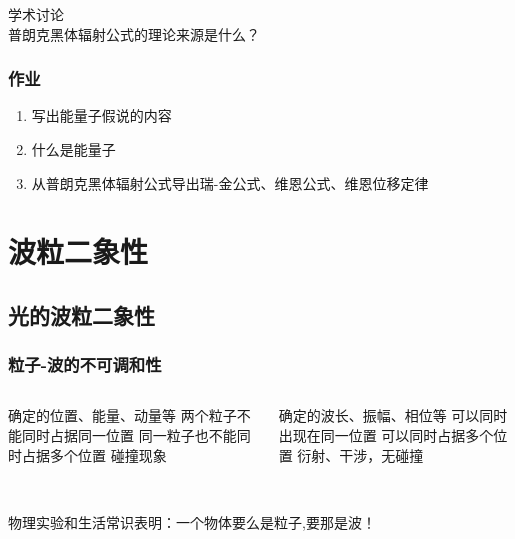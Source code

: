 \begin{frame}
    \frametitle{}
    \begin{atcbox}{学术讨论}
        ~~\\ 
        普朗克黑体辐射公式的理论来源是什么？
        ~~\\ 
    \end{atcbox}
\end{frame}

\begin{frame}
    \frametitle{作业}
   \begin{enumerate}
       \item 写出能量子假说的内容
       \item 什么是能量子
       \item 从普朗克黑体辐射公式导出瑞-金公式、维恩公式、维恩位移定律
   \end{enumerate}
\end{frame}

\section{波粒二象性} 

\subsection{光的波粒二象性} 

\begin{frame}
    \frametitle{粒子-波的不可调和性}
	\begin{columns}
		\begin{column}[t]{0.49\linewidth}
			\emf[粒子性：] 
			\begin{itemize}
				\Item  确定的位置、能量、动量等
				\Item  两个粒子不能同时占据同一位置
				\Item  同一粒子也不能同时占据多个位置
				\Item  碰撞现象
			\end{itemize}
		\end{column}
		\begin{column}[t]{0.46\linewidth}
			\emf[波动性:] 
			\vspace{1ex}
			\begin{itemize}
				\Item  确定的波长、振幅、相位等
				\Item  可以同时出现在同一位置
				\Item  可以同时占据多个位置
				\Item  衍射、干涉，无碰撞
			\end{itemize}
		\end{column}
	\end{columns}
    ~~\\ 
    物理实验和生活常识表明：一个物体要么是粒子,要那是波！
\end{frame}

